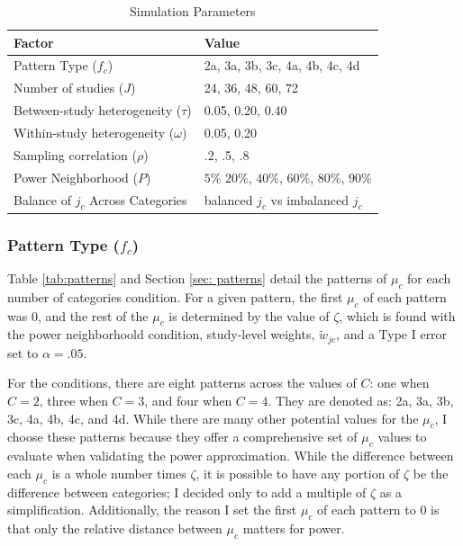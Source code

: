 \begin{table}[H]
\caption{Simulation Parameters}
     \label{tab:experimentalconditions}
    \centering
    \begin{tabular}{p{7cm}p{7cm}}
        \toprule
    Factor & Value \\ \midrule

       Pattern Type ($f_c$)  & 2a, 3a, 3b, 3c, 4a, 4b, 4c, 4d \\
       Number of studies ($J$)  & 24, 36, 48, 60, 72  \\ 
       Between-study heterogeneity ($\tau$)  & 0.05, 0.20, 0.40 \\
       Within-study heterogeneity ($\omega$) & 0.05, 0.20 \\
       Sampling correlation ($\rho$) & .2, .5, .8 \\
       Power Neighborhood ($P$) & $5\%$ $20\%$, $40\%$, $60\%$, $80\%$, $90\%$ \\
       Balance of $j_c$ Across Categories & balanced $j_c$ vs imbalanced $j_c$ \\
        \bottomrule
    \end{tabular}
   
    \small
    
\end{table}


\subsubsection{Pattern Type ($f_c$)} \label{sec: Pattern Type}


Table \ref{tab:patterns} and Section \ref{sec: patterns} detail the patterns of $\mu_c$ for each number of categories condition. For a given pattern, the first $\mu_c$ of each pattern was 0, and the rest of the $\mu_c$ is determined by the value of $\zeta$, which is found with the power neighborhoold condition, study-level weights, $\tilde{w}_{jc}$, and a Type I error set to $\alpha = .05$. 

For the conditions, there are eight patterns across the values of $C$: one when $C = 2$, three when $C = 3$, and four when $C = 4$. They are denoted as:  2a, 3a, 3b, 3c, 4a, 4b, 4c, and 4d.  While there are many other potential values for the $\mu_c$, I choose these patterns because they offer a comprehensive set of $\mu_c$ values to evaluate when validating the power approximation. While the difference between each $\mu_c$ is a whole number times $\zeta$, it is possible to have any portion of $\zeta$ be the difference between categories; I decided only to add a multiple of $\zeta$ as a simplification. Additionally, the reason I set the first $\mu_c$ of each pattern to $0$ is that only the relative distance between $\mu_c$ matters for power. 

